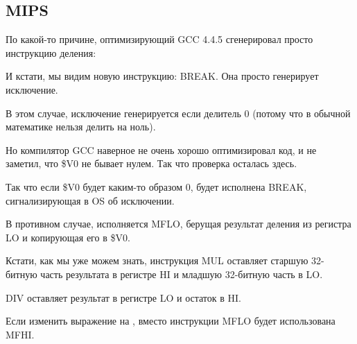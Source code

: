 ﻿\subsection{MIPS}

По какой-то причине, оптимизирующий GCC 4.4.5 сгенерировал просто инструкцию деления:




И кстати, мы видим новую инструкцию: BREAK. Она просто генерирует исключение.

В этом случае, исключение генерируется если делитель 0 (потому что в обычной математике нельзя
делить на ноль).

Но компилятор GCC наверное не очень хорошо оптимизировал код, и не заметил, что \$V0 не бывает нулем.
Так что проверка осталась здесь.

Так что если \$V0 будет каким-то образом 0, будет исполнена BREAK, сигнализирующая в \ac{OS} 
об исключении.

В противном случае, исполняется MFLO, берущая результат деления из регистра LO и копирующая его в \$V0.


Кстати, как мы уже можем знать, инструкция MUL оставляет старшую 32-битную часть результата
в регистре HI и младшую 32-битную часть в LO.

DIV оставляет результат в регистре LO и остаток в HI.

Если изменить выражение на , вместо инструкции MFLO будет использована MFHI.
